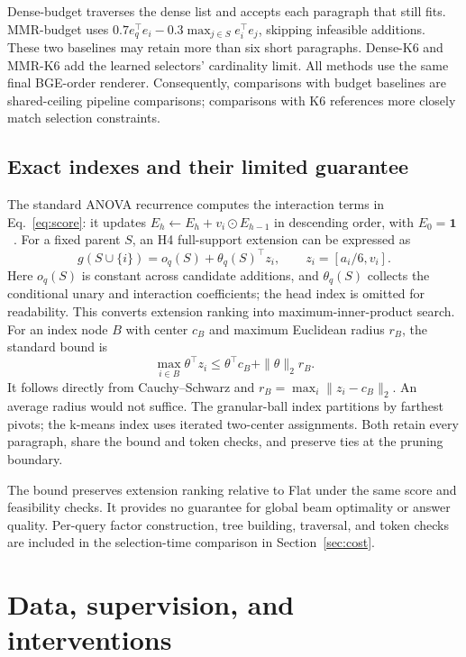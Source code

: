 \documentclass[preprint,12pt]{elsarticle}
\begin{document}
Dense-budget traverses the dense list and accepts each paragraph that still fits. MMR-budget uses $0.7e_q^\top e_i-0.3\max_{j\in S}e_i^\top e_j$, skipping infeasible additions. These two baselines may retain more than six short paragraphs. Dense-K6 and MMR-K6 add the learned selectors' cardinality limit. All methods use the same final BGE-order renderer. Consequently, comparisons with budget baselines are shared-ceiling pipeline comparisons; comparisons with K6 references more closely match selection constraints.

\subsection{Exact indexes and their limited guarantee}
The standard ANOVA recurrence computes the interaction terms in Eq.~\ref{eq:score}: it updates $E_h\leftarrow E_h+v_i\odot E_{h-1}$ in descending order, with $E_0=\mathbf1$~\cite{blondel2016hofm}. For a fixed parent $S$, an H4 full-support extension can be expressed as
\begin{equation}
g(S\cup\{i\})=o_q(S)+\theta_q(S)^\top z_i,
\qquad z_i=[a_i/6,v_i].
\end{equation}
Here $o_q(S)$ is constant across candidate additions, and $\theta_q(S)$ collects the conditional unary and interaction coefficients; the head index is omitted for readability. This converts extension ranking into maximum-inner-product search. For an index node $B$ with center $c_B$ and maximum Euclidean radius $r_B$, the standard bound is
\begin{equation}\label{eq:bound}
\max_{i\in B}\theta^\top z_i\leq\theta^\top c_B+\|\theta\|_2r_B.
\end{equation}
It follows directly from Cauchy--Schwarz and $r_B=\max_i\|z_i-c_B\|_2$. An average radius would not suffice. The granular-ball index partitions by farthest pivots; the k-means index uses iterated two-center assignments. Both retain every paragraph, share the bound and token checks, and preserve ties at the pruning boundary.

The bound preserves extension ranking relative to Flat under the same score and feasibility checks. It provides no guarantee for global beam optimality or answer quality. Per-query factor construction, tree building, traversal, and token checks are included in the selection-time comparison in Section~\ref{sec:cost}.

\section{Data, supervision, and interventions}\label{sec:data}
\end{document}
